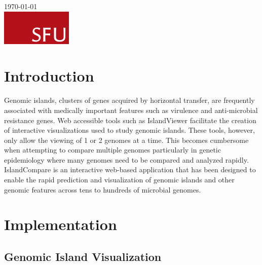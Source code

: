 \begin{titlepage}


		{\large \today}\\[2cm] %


		\includegraphics{SFUlogo.png}\\[1cm] %


		\vfill %

	\end{titlepage}

	\begin{abstract}

	\end{abstract}

	\section{Introduction}
        Genomic islands, clusters of genes acquired by horizontal transfer, are frequently associated with medically important features such as virulence and anti-microbial resistance genes.\cite{3_dobrindt_2004, 4_hackerkaper_2000} Web accessible tools such as IslandViewer facilitate the creation of interactive visualizations used to study genomic islands.\cite{2_islandviewer3} These tools, however, only allow the viewing of 1 or 2 genomes at a time. This becomes cumbersome when attempting to compare multiple genomes particularly in genetic epidemiology where many genomes need to be compared and analyzed rapidly. IslandCompare is an interactive web-based application that has been designed to enable the rapid prediction and visualization of genomic islands and other genomic features across tens to hundreds of microbial genomes. 
        
	\section{Implementation}
	
	\subsection{Genomic Island Visualization}

	\clearpage
	
	

